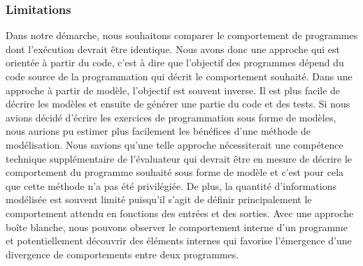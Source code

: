 %
%

\subsubsection*{Limitations}
Dans notre démarche, nous souhaitons comparer le comportement de programmes dont l'exécution devrait être identique. Nous avons donc une approche qui est orientée à partir du code, c'est à dire que l'objectif des programmes dépend du code source de la programmation qui décrit le comportement souhaité. 
Dans une approche à partir de modèle, l'objectif est souvent inverse. Il est plus facile de décrire les modèles et ensuite de générer une partie du code et des tests. 
Si nous avions décidé d'écrire les exercices de programmation sous forme de modèles, nous aurions pu estimer plus facilement les bénéfices d'une méthode de modélisation. Nous savions qu'une telle approche nécessiterait une compétence technique supplémentaire de l'évaluateur qui devrait être en mesure de décrire le comportement du programme souhaité sous forme de modèle et c'est pour cela que cette méthode n'a pas été privilégiée.
De plus, la quantité d'informations modélisée est souvent limité puisqu'il s'agit de définir principalement le comportement attendu en fonctions des entrées et des sorties. Avec une approche boîte blanche, nous pouvons observer le comportement interne d'un programme et potentiellement découvrir des éléments internes qui favorise l'émergence d'une divergence de comportements entre deux programmes.

